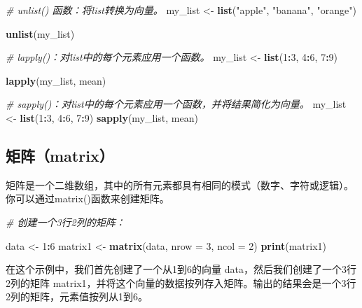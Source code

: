 \documentclass[]{book}
\newenvironment{Shaded}{\begin{snugshade}}{\end{snugshade}}
\newcommand{\CommentTok}[1]{\textcolor[rgb]{0.56,0.35,0.01}{\textit{#1}}}
\newcommand{\DataTypeTok}[1]{\textcolor[rgb]{0.13,0.29,0.53}{#1}}
\newcommand{\DecValTok}[1]{\textcolor[rgb]{0.00,0.00,0.81}{#1}}
\newcommand{\KeywordTok}[1]{\textcolor[rgb]{0.13,0.29,0.53}{\textbf{#1}}}
\newcommand{\NormalTok}[1]{#1}
\newcommand{\OperatorTok}[1]{\textcolor[rgb]{0.81,0.36,0.00}{\textbf{#1}}}
\newcommand{\StringTok}[1]{\textcolor[rgb]{0.31,0.60,0.02}{#1}}
\begin{document}
\begin{Shaded}
\begin{Highlighting}[]
\CommentTok{# unlist() 函数：将list转换为向量。}
\NormalTok{my_list <-}\StringTok{ }\KeywordTok{list}\NormalTok{(}\StringTok{"apple"}\NormalTok{, }\StringTok{"banana"}\NormalTok{, }\StringTok{"orange"}\NormalTok{)}

\KeywordTok{unlist}\NormalTok{(my_list) }

\CommentTok{# lapply()：对list中的每个元素应用一个函数。}
\NormalTok{my_list <-}\StringTok{ }\KeywordTok{list}\NormalTok{(}\DecValTok{1}\OperatorTok{:}\DecValTok{3}\NormalTok{, }\DecValTok{4}\OperatorTok{:}\DecValTok{6}\NormalTok{, }\DecValTok{7}\OperatorTok{:}\DecValTok{9}\NormalTok{)}

\KeywordTok{lapply}\NormalTok{(my_list, mean)}

\CommentTok{# sapply()：对list中的每个元素应用一个函数，并将结果简化为向量。}
\NormalTok{my_list <-}\StringTok{ }\KeywordTok{list}\NormalTok{(}\DecValTok{1}\OperatorTok{:}\DecValTok{3}\NormalTok{, }\DecValTok{4}\OperatorTok{:}\DecValTok{6}\NormalTok{, }\DecValTok{7}\OperatorTok{:}\DecValTok{9}\NormalTok{)}
\KeywordTok{sapply}\NormalTok{(my_list, mean)}
\end{Highlighting}
\end{Shaded}

\hypertarget{ux77e9ux9635matrix}{%
\subsection{矩阵（matrix）}\label{ux77e9ux9635matrix}}

矩阵是一个二维数组，其中的所有元素都具有相同的模式（数字、字符或逻辑）。你可以通过matrix()函数来创建矩阵。

\begin{Shaded}
\begin{Highlighting}[]
\CommentTok{# 创建一个3行2列的矩阵：}

\NormalTok{data <-}\StringTok{ }\DecValTok{1}\OperatorTok{:}\DecValTok{6}
\NormalTok{matrix1 <-}\StringTok{ }\KeywordTok{matrix}\NormalTok{(data, }\DataTypeTok{nrow =} \DecValTok{3}\NormalTok{, }\DataTypeTok{ncol =} \DecValTok{2}\NormalTok{)}
\KeywordTok{print}\NormalTok{(matrix1)}
\end{Highlighting}
\end{Shaded}

在这个示例中，我们首先创建了一个从1到6的向量 data，然后我们创建了一个3行2列的矩阵 matrix1，并将这个向量的数据按列存入矩阵。输出的结果会是一个3行2列的矩阵，元素值按列从1到6。
\end{document}
